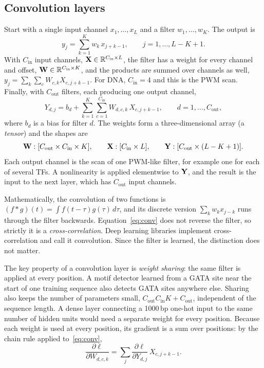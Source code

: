 \subsection{Convolution layers}

Start with a single input channel $x_1,\dots,x_L$ and a filter $w_1,\dots,w_K$. The output is
\begin{equation}
  y_j = \sum_{k=1}^{K}w_k\,x_{j+k-1}, \qquad j=1,\dots,L-K+1 .
\end{equation}
With $C_{\text{in}}$ input channels, $\mathbf{X}\in\mathbb{R}^{C_{\text{in}}\times L}$, the filter has a weight for every channel and offset, $\mathbf{W}\in\mathbb{R}^{C_{\text{in}}\times K}$, and the products are summed over channels as well, $y_j=\sum_{k}\sum_{c}W_{c,k}X_{c,j+k-1}$. For DNA, $C_{\text{in}}=4$ and this is the PWM scan. Finally, with $C_{\text{out}}$ filters, each producing one output channel,
\begin{equation}
  Y_{d,j} = b_d + \sum_{k=1}^{K}\sum_{c=1}^{C_{\text{in}}}W_{d,c,k}\,X_{c,j+k-1}, \qquad d=1,\dots,C_{\text{out}},
  \label{eq:conv}
\end{equation}
where $b_d$ is a bias for filter $d$. The weights form a three-dimensional array (a \emph{tensor}) and the shapes are
\begin{equation}
  \mathbf{W}: [C_{\text{out}}\times C_{\text{in}}\times K], \qquad \mathbf{X}: [C_{\text{in}}\times L], \qquad \mathbf{Y}: [C_{\text{out}}\times(L-K+1)].
\end{equation}
Each output channel is the scan of one PWM-like filter, for example one for each of several TFs. A nonlinearity is applied elementwise to $\mathbf{Y}$, and the result is the input to the next layer, which has $C_{\text{out}}$ input channels.

Mathematically, the convolution of two functions is $(f*g)(t)=\int f(t-\tau)g(\tau)\,d\tau$, and its discrete version $\sum_kw_kx_{j-k}$ runs through the filter backwards. Equation~\eqref{eq:conv} does not reverse the filter, so strictly it is a \emph{cross-correlation}. Deep learning libraries implement cross-correlation and call it convolution. Since the filter is learned, the distinction does not matter.

The key property of a convolution layer is \emph{weight sharing}: the same filter is applied at every position. A motif detector learned from a GATA site near the start of one training sequence also detects GATA sites anywhere else. Sharing also keeps the number of parameters small, $C_{\text{out}}C_{\text{in}}K+C_{\text{out}}$, independent of the sequence length. A dense layer connecting a 1000\,bp one-hot input to the same number of hidden units would need a separate weight for every position. Because each weight is used at every position, its gradient is a sum over positions: by the chain rule applied to~\eqref{eq:conv},
\begin{equation}
  \frac{\partial\ell}{\partial W_{d,c,k}} = \sum_{j}\frac{\partial\ell}{\partial Y_{d,j}}\,X_{c,j+k-1}.
\end{equation}

